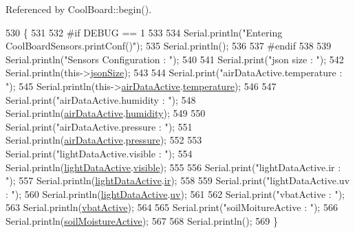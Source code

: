 Referenced by Cool\+Board\+::begin().


\begin{DoxyCode}
530 \{
531 
532 \textcolor{preprocessor}{#if DEBUG == 1}
533 
534     Serial.println(\textcolor{stringliteral}{"Entering CoolBoardSensors.printConf()"});
535     Serial.println();
536 
537 \textcolor{preprocessor}{#endif}
538 
539     Serial.println(\textcolor{stringliteral}{"Sensors Configuration : "});
540     
541     Serial.print(\textcolor{stringliteral}{"json size : "});
542     Serial.println(this->\hyperlink{classCoolBoardSensors_a05a40dc80bfff14ffb830f549b876f8d}{jsonSize});
543 
544     Serial.print(\textcolor{stringliteral}{"airDataActive.temperature : "});
545     Serial.println(this->\hyperlink{classCoolBoardSensors_abff8dfeccb2f7689847bb64d5f1cd31e}{airDataActive}.\hyperlink{structCoolBoardSensors_1_1airActive_a9a6633c426b0508e30ebc1832ec6d745}{temperature});
546 
547     Serial.print(\textcolor{stringliteral}{"airDataActive.humidity : "});
548     Serial.println(\hyperlink{classCoolBoardSensors_abff8dfeccb2f7689847bb64d5f1cd31e}{airDataActive}.\hyperlink{structCoolBoardSensors_1_1airActive_ae5740445054b27415e22f450576accb7}{humidity});
549 
550     Serial.print(\textcolor{stringliteral}{"airDataActive.pressure : "});
551     Serial.println(\hyperlink{classCoolBoardSensors_abff8dfeccb2f7689847bb64d5f1cd31e}{airDataActive}.\hyperlink{structCoolBoardSensors_1_1airActive_ab200826a70d1dc9945f5efb6b9c732ed}{pressure});
552 
553     Serial.print(\textcolor{stringliteral}{"lightDataActive.visible : "});
554     Serial.println(\hyperlink{classCoolBoardSensors_ac4deb1cf41bac8b91c780c92fab00ba4}{lightDataActive}.\hyperlink{structCoolBoardSensors_1_1lightActive_abcbba296b6a95e67c0cd2555d9dd50c7}{visible});
555 
556     Serial.print(\textcolor{stringliteral}{"lightDataActive.ir : "});
557     Serial.println(\hyperlink{classCoolBoardSensors_ac4deb1cf41bac8b91c780c92fab00ba4}{lightDataActive}.\hyperlink{structCoolBoardSensors_1_1lightActive_a67700895349b95ceb263f1a6da756315}{ir});
558 
559     Serial.print(\textcolor{stringliteral}{"lightDataActive.uv : "});
560     Serial.println(\hyperlink{classCoolBoardSensors_ac4deb1cf41bac8b91c780c92fab00ba4}{lightDataActive}.\hyperlink{structCoolBoardSensors_1_1lightActive_a949a7aaf5166d981de8fe0fd93da20d6}{uv});
561     
562     Serial.print(\textcolor{stringliteral}{"vbatActive : "});
563     Serial.println(\hyperlink{classCoolBoardSensors_af5039ad760b0ff0aa7eee16c55e81702}{vbatActive});
564 
565     Serial.print(\textcolor{stringliteral}{"soilMoitureActive : "});
566     Serial.println(\hyperlink{classCoolBoardSensors_a31983eecc0f9cd000e1f912206ea4dc8}{soilMoistureActive});
567 
568     Serial.println();
569 \}
\end{DoxyCode}
